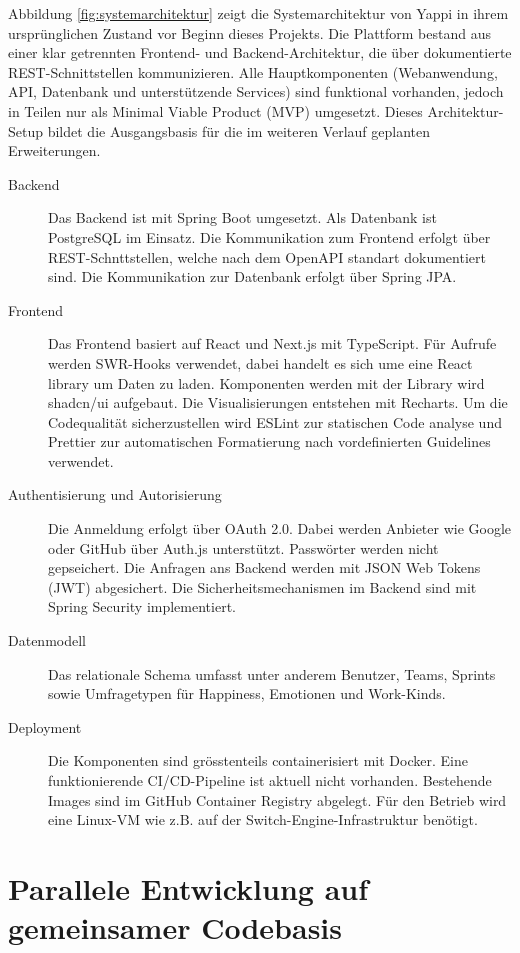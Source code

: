 \documentclass[12pt,a4paper]{report}
\begin{document}
Abbildung \ref{fig:systemarchitektur} zeigt die Systemarchitektur von Yappi in ihrem ursprünglichen Zustand vor Beginn dieses
Projekts. Die Plattform bestand aus einer klar getrennten Frontend- und Backend-Architektur, die über dokumentierte
REST-Schnittstellen kommunizieren. Alle Hauptkomponenten (Webanwendung, API, Datenbank und unterstützende Services) sind 
funktional vorhanden, jedoch in Teilen nur als Minimal Viable Product (MVP) umgesetzt. Dieses Architektur-Setup bildet die
Ausgangsbasis für die im weiteren Verlauf geplanten Erweiterungen.

\begin{description}
  \item[Backend] Das Backend ist mit Spring Boot umgesetzt. Als Datenbank ist PostgreSQL im Einsatz. Die Kommunikation zum Frontend
    erfolgt über REST-Schnttstellen, welche nach dem OpenAPI standart dokumentiert sind. Die Kommunikation zur Datenbank erfolgt
    über Spring JPA.
  \item[Frontend] Das Frontend basiert auf React und Next.js mit TypeScript. Für Aufrufe werden SWR-Hooks verwendet, dabei handelt
    es sich ume eine React library um Daten zu laden. Komponenten werden mit der Library wird shadcn/ui aufgebaut. Die 
    Visualisierungen entstehen mit Recharts. Um die Codequalität sicherzustellen wird ESLint zur statischen Code analyse und 
    Prettier zur automatischen Formatierung nach vordefinierten Guidelines verwendet.
  \item[Authentisierung und Autorisierung] Die Anmeldung erfolgt über OAuth 2.0. Dabei werden Anbieter wie Google oder GitHub 
    über Auth.js unterstützt. Passwörter werden nicht gepseichert. Die Anfragen ans Backend werden mit JSON Web Tokens (JWT) 
    abgesichert. Die Sicherheitsmechanismen im Backend sind mit Spring Security implementiert.
  \item[Datenmodell] Das relationale Schema umfasst unter anderem Benutzer, Teams, Sprints sowie Umfragetypen für Happiness,
    Emotionen und Work-Kinds.
  \item[Deployment] Die Komponenten sind grösstenteils containerisiert mit Docker. Eine funktionierende CI/CD-Pipeline ist aktuell
    nicht vorhanden. Bestehende Images sind im GitHub Container Registry abgelegt. Für den Betrieb wird eine Linux-VM wie z.B. auf
    der Switch-Engine-Infrastruktur benötigt.
\end{description}

\section{Parallele Entwicklung auf gemeinsamer Codebasis}
\end{document}
